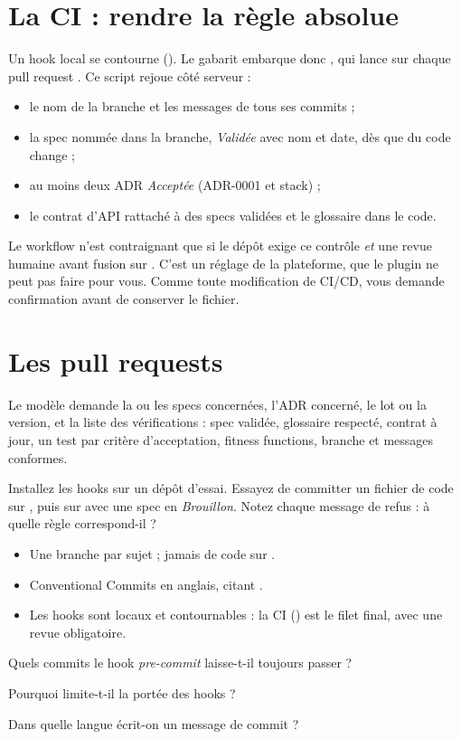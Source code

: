 \section{La CI : rendre la règle absolue}
Un hook local se contourne (). Le gabarit embarque donc , qui lance sur chaque pull request . Ce script rejoue côté serveur :
\begin{itemize}
  \item le nom de la branche et les messages de tous ses commits ;
  \item la spec nommée dans la branche, \emph{Validée} avec nom et date, dès que du code change ;
  \item au moins deux ADR \emph{Acceptée} (ADR-0001 et stack) ;
  \item le contrat d'API rattaché à des specs validées et le glossaire dans le code.
\end{itemize}
\begin{piege}
Le workflow n'est contraignant que si le dépôt exige ce contrôle \emph{et} une revue humaine avant fusion sur . C'est un réglage de la plateforme, que le plugin ne peut pas faire pour vous. Comme toute modification de CI/CD,  vous demande confirmation avant de conserver le fichier.
\end{piege}

\section{Les pull requests}
Le modèle  demande la ou les specs concernées, l'ADR concerné, le lot ou la version, et la liste des
vérifications : spec validée, glossaire respecté, contrat à jour, un test par critère d'acceptation, fitness functions, branche et messages conformes.

\begin{vousjouez}
Installez les hooks sur un dépôt d'essai. Essayez de committer un fichier de code sur , puis sur
 avec une spec en \emph{Brouillon}. Notez chaque message de refus : à quelle règle correspond-il ?
\end{vousjouez}

\begin{retenir}[À retenir]
\begin{itemize}
  \item Une branche par sujet ; jamais de code sur .
  \item Conventional Commits en anglais, citant .
  \item Les hooks sont locaux et contournables : la CI () est le filet final, avec une revue obligatoire.
\end{itemize}
\end{retenir}

\begin{acquis}
  \item Quels commits le hook \emph{pre-commit} laisse-t-il toujours passer ?
  \item Pourquoi  limite-t-il la portée des hooks ?
  \item Dans quelle langue écrit-on un message de commit ?
\end{acquis}
